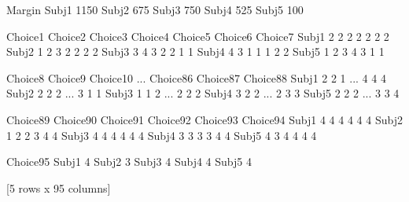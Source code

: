 \documentclass[letterpaper,10pt,english]{jupyterBook}
\begin{document}
\begin{sphinxVerbatim}[commandchars=\\\{\}]
        Margin
Subj\PYGZus{}1    1150
Subj\PYGZus{}2    \PYGZhy{}675
Subj\PYGZus{}3    \PYGZhy{}750
Subj\PYGZus{}4    \PYGZhy{}525
Subj\PYGZus{}5     100
\end{sphinxVerbatim}

\begin{sphinxVerbatim}[commandchars=\\\{\}]
\end{sphinxVerbatim}

\begin{sphinxVerbatim}[commandchars=\\\{\}]
        Choice\PYGZus{}1  Choice\PYGZus{}2  Choice\PYGZus{}3  Choice\PYGZus{}4  Choice\PYGZus{}5  Choice\PYGZus{}6  Choice\PYGZus{}7  \PYGZbs{}
Subj\PYGZus{}1         2         2         2         2         2         2         2   
Subj\PYGZus{}2         1         2         3         2         2         2         2   
Subj\PYGZus{}3         3         4         3         2         2         1         1   
Subj\PYGZus{}4         4         3         1         1         1         2         2   
Subj\PYGZus{}5         1         2         3         4         3         1         1   

        Choice\PYGZus{}8  Choice\PYGZus{}9  Choice\PYGZus{}10  ...  Choice\PYGZus{}86  Choice\PYGZus{}87  Choice\PYGZus{}88  \PYGZbs{}
Subj\PYGZus{}1         2         2          1  ...          4          4          4   
Subj\PYGZus{}2         2         2          2  ...          3          1          1   
Subj\PYGZus{}3         1         1          2  ...          2          2          2   
Subj\PYGZus{}4         3         2          2  ...          2          3          3   
Subj\PYGZus{}5         2         2          2  ...          3          3          4   

        Choice\PYGZus{}89  Choice\PYGZus{}90  Choice\PYGZus{}91  Choice\PYGZus{}92  Choice\PYGZus{}93  Choice\PYGZus{}94  \PYGZbs{}
Subj\PYGZus{}1          4          4          4          4          4          4   
Subj\PYGZus{}2          1          2          2          3          4          4   
Subj\PYGZus{}3          4          4          4          4          4          4   
Subj\PYGZus{}4          3          3          3          3          4          4   
Subj\PYGZus{}5          4          3          4          4          4          4   

        Choice\PYGZus{}95  
Subj\PYGZus{}1          4  
Subj\PYGZus{}2          3  
Subj\PYGZus{}3          4  
Subj\PYGZus{}4          4  
Subj\PYGZus{}5          4  

[5 rows x 95 columns]
\end{sphinxVerbatim}
\end{document}
